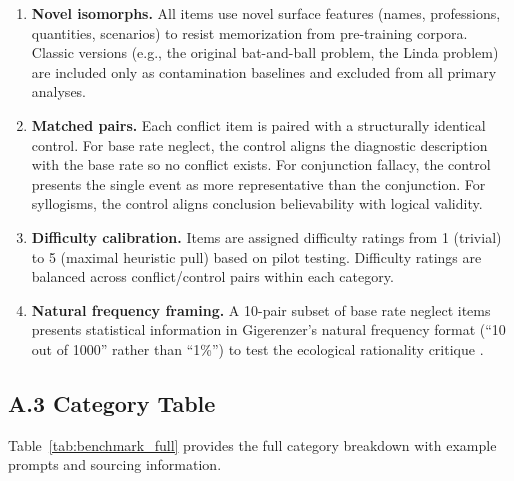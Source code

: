 \documentclass[accepted]{article}
\begin{document}
\begin{enumerate}[leftmargin=*,itemsep=4pt]
  \item \textbf{Novel isomorphs.}  All items use novel surface features
  (names, professions, quantities, scenarios) to resist memorization
  from pre-training corpora.  Classic versions (e.g., the original
  bat-and-ball problem, the Linda problem) are included only as
  contamination baselines and excluded from all primary analyses.

  \item \textbf{Matched pairs.}  Each conflict item is paired with a
  structurally identical control.  For base rate neglect, the control
  aligns the diagnostic description with the base rate so no conflict
  exists.  For conjunction fallacy, the control presents the single
  event as more representative than the conjunction.  For syllogisms,
  the control aligns conclusion believability with logical validity.

  \item \textbf{Difficulty calibration.}  Items are assigned difficulty
  ratings from 1 (trivial) to 5 (maximal heuristic pull) based on pilot
  testing.  Difficulty ratings are balanced across conflict/control pairs
  within each category.

  \item \textbf{Natural frequency framing.}  A 10-pair subset of base
  rate neglect items presents statistical information in Gigerenzer's
  natural frequency format (``10 out of 1000'' rather than ``1\%'') to
  test the ecological rationality critique
  \citep{gigerenzer1995improve}.
\end{enumerate}

\subsection*{A.3 Category Table}

Table~\ref{tab:benchmark_full} provides the full category breakdown
with example prompts and sourcing information.
\end{document}
